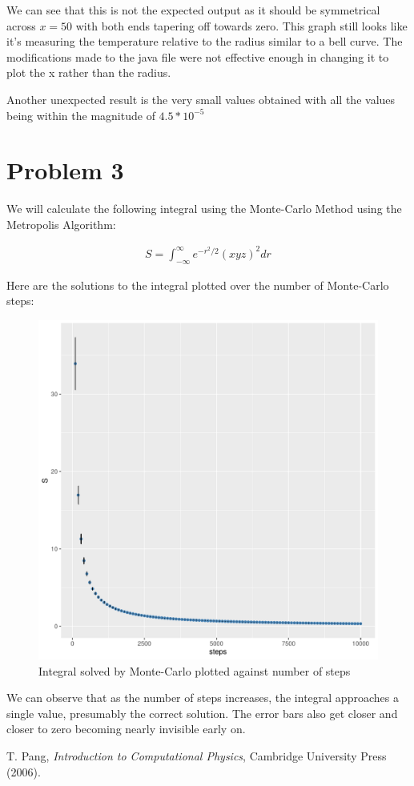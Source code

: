 \documentclass[prb,twocolumn]{revtex4-2}
\begin{document}
We can see that this is not the expected output as it should be symmetrical
across $x=50$ with both ends tapering off towards zero. This graph still looks 
like it's measuring the temperature relative to the radius similar to a bell 
curve. The modifications made to the java file were not effective enough in
changing it to plot the x rather than the radius.

Another unexpected result is the very small values obtained with all the values
being within the magnitude of $4.5*10^{-5}$


\section{Problem 3}

We will calculate the following integral using the Monte-Carlo Method using the
Metropolis Algorithm:

\begin{eqnarray}
    S = \int_{-\infty}^{\infty} e^{-r^2/2} (xyz)^2 dr
\end{eqnarray}

Here are the solutions to the integral plotted over the number of Monte-Carlo
steps:

\begin{figure}[H]
    \centerline{\includegraphics [width=3 in] {p3/p3}}
    \caption{Integral solved by Monte-Carlo plotted against number of steps}
    \label{q1}
\end{figure}

We can observe that as the number of steps increases, the integral approaches a
single value, presumably the correct solution. The error bars also get closer
and closer to zero becoming nearly invisible early on.

\begin{thebibliography}{99}

 T. Pang, \emph{Introduction to Computational Physics},
    Cambridge University Press (2006).

\end{thebibliography}
\end{document}
